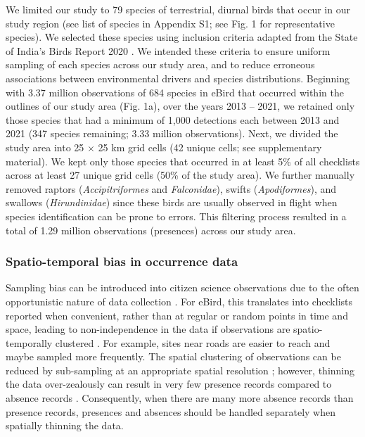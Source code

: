 We limited our study to 79 species of terrestrial, diurnal birds that occur in our study region (see list of species in Appendix S1; see Fig. 1 for representative species).
We selected these species using inclusion criteria adapted from the State of India's Birds Report 2020 \citep[SoIB][]{viswanathan2020}.
We intended these criteria to ensure uniform sampling of each species across our study area, and to reduce erroneous associations between environmental drivers and species distributions.
Beginning with 3.37 million observations of 684 species in eBird that occurred within the outlines of our study area (Fig. 1a), over the years 2013 -- 2021, we retained only those species that had a minimum of 1,000 detections each between 2013 and 2021 (347 species remaining; 3.33 million observations).
Next, we divided the study area into 25 $\times$ 25 km grid cells (42 unique cells; see supplementary material).
We kept only those species that occurred in at least 5\% of all checklists across at least 27 unique grid cells (50\% of the study area).
We further manually removed raptors (\textit{Accipitriformes} and \textit{Falconidae}), swifts (\textit{Apodiformes}), and swallows (\textit{Hirundinidae}) since these birds are usually observed in flight when species identification can be prone to errors.
This filtering process resulted in a total of 1.29 million observations (presences) across our study area.

\subsubsection*{Spatio-temporal bias in occurrence data}

Sampling bias can be introduced into citizen science observations due to the often opportunistic nature of data collection \citep{sullivan2014a}.
For eBird, this translates into checklists reported when convenient, rather than at regular or random points in time and space, leading to non-independence in the data if observations are spatio-temporally clustered \citep{johnston2021a}.
For example, sites near roads are easier to reach and maybe sampled more frequently.
The spatial clustering of observations can be reduced by sub-sampling at an appropriate spatial resolution \citep{aiello-lammens2015a}; however, thinning the data over-zealously can result in very few presence records compared to absence records \citep[i.e., class imbalance][]{steen2019}.
Consequently, when there are many more absence records than presence records, presences and absences should be handled separately when spatially thinning the data.

